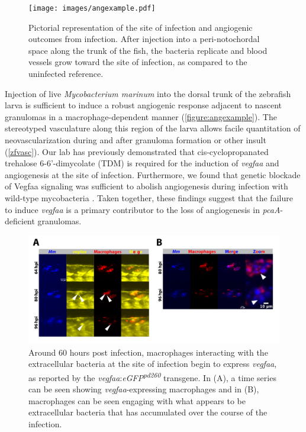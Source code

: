 \begin{figure}
\centering
\texttt{[image: images/angexample.pdf]}
\caption[Diagram of trunk injections in the larval zebrafish]{Pictorial representation of the site of infection and angiogenic outcomes from infection. After injection into a peri\hyp{}notochordal space along the trunk of the fish, the bacteria replicate and blood vessels grow toward the site of infection, as compared to the uninfected reference.}
\label{figure:angexample}

\end{figure}

Injection of live \textit{Mycobacterium marinum} into the dorsal trunk of the zebrafish larva is sufficient to induce a robust angiogenic response adjacent to nascent granulomas in a macrophage\hyp{}dependent manner \citep{Oehlers2015} (\autoref{figure:angexample}). The stereotyped vasculature along this region of the larva allows facile quantitation of neovascularization during and after granuloma formation or other insult \citep{Lawson2002, Jin2005, Gore2012, Matsuoka2018} (\autoref{zfvasc}). Our lab has previously demonstrated that cis\hyp{}cyclopropanated trehalose 6\hyp{}6'\hyp{}dimycolate (TDM) is required for the induction of \textit{vegfaa} and angiogenesis at the site of infection. Furthermore, we found that genetic blockade of Vegfaa signaling was sufficient to abolish angiogenesis during infection with wild\hyp{}type mycobacteria \citep{Walton2018}. Taken together, these findings suggest that the failure to induce \textit{vegfaa} is a primary contributor to the loss of angiogenesis in \textit{pcaA}\hyp{}deficient granulomas.

\begin{figure}
\centering
\includegraphics[width=\textwidth]{images/extracellularvegfa.pdf}
\caption[Extracellular bacterial accumulation corresponds to \textit{vegfaa} induction]{Around 60 hours post infection, macrophages interacting with the extracellular bacteria at the site of infection begin to express \textit{vegfaa}, as reported by the \textit{vegfaa}:\textit{eGFP\textsuperscript{pd260}} transgene. In (A), a time series can be seen showing \textit{vegfaa}\hyp{}expressing macrophages and in (B), macrophages can be seen engaging with what appears to be extracellular bacteria that has accumulated over the course of the infection.}
\label{figure:ecvegfa}
\end{figure}

